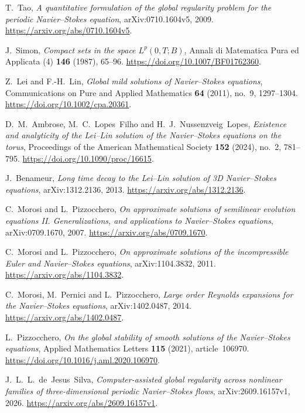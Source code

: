 T.~Tao,
\emph{A quantitative formulation of the global regularity problem for the
periodic Navier--Stokes equation}, arXiv:0710.1604v5, 2009.
\url{https://arxiv.org/abs/0710.1604v5}.

J.~Simon,
\emph{Compact sets in the space $L^p(0,T;B)$},
Annali di Matematica Pura ed Applicata (4) \textbf{146} (1987), 65--96.
\url{https://doi.org/10.1007/BF01762360}.

Z.~Lei and F.-H.~Lin,
\emph{Global mild solutions of Navier--Stokes equations},
Communications on Pure and Applied Mathematics \textbf{64} (2011),
no.~9, 1297--1304.
\url{https://doi.org/10.1002/cpa.20361}.

D.~M.~Ambrose, M.~C.~Lopes~Filho and H.~J.~Nussenzveig~Lopes,
\emph{Existence and analyticity of the Lei--Lin solution of the
Navier--Stokes equations on the torus},
Proceedings of the American Mathematical Society \textbf{152} (2024),
no.~2, 781--795.
\url{https://doi.org/10.1090/proc/16615}.

J.~Benameur,
\emph{Long time decay to the Lei--Lin solution of 3D Navier--Stokes equations},
arXiv:1312.2136, 2013.
\url{https://arxiv.org/abs/1312.2136}.

C.~Morosi and L.~Pizzocchero,
\emph{On approximate solutions of semilinear evolution equations II.
Generalizations, and applications to Navier--Stokes equations},
arXiv:0709.1670, 2007.
\url{https://arxiv.org/abs/0709.1670}.

C.~Morosi and L.~Pizzocchero,
\emph{On approximate solutions of the incompressible Euler and Navier--Stokes equations},
arXiv:1104.3832, 2011.
\url{https://arxiv.org/abs/1104.3832}.

C.~Morosi, M.~Pernici and L.~Pizzocchero,
\emph{Large order Reynolds expansions for the Navier--Stokes equations},
arXiv:1402.0487, 2014.
\url{https://arxiv.org/abs/1402.0487}.

L.~Pizzocchero,
\emph{On the global stability of smooth solutions of the Navier--Stokes equations},
Applied Mathematics Letters \textbf{115} (2021), article~106970.
\url{https://doi.org/10.1016/j.aml.2020.106970}.

J.~L.~L.~de~Jesus~Silva,
\emph{Computer-assisted global regularity across nonlinear families of
three-dimensional periodic Navier--Stokes flows},
arXiv:2609.16157v1, 2026.
\url{https://arxiv.org/abs/2609.16157v1}.
